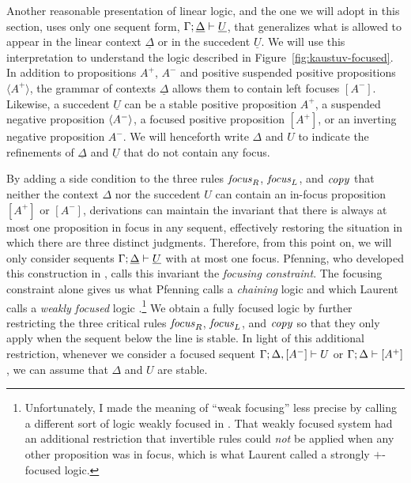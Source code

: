 Another reasonable presentation of linear logic, and the one we will
adopt in this section, uses only one sequent form,
${\Gamma};{\underline{\Delta}} \vdash {\underline{U}} \mathstrut$, that
generalizes what is allowed to appear in the linear context
$\underline{\Delta}$ or in the succedent $\underline{U}$. We will use
this interpretation to understand the logic described in
Figure~\ref{fig:kaustuv-focused}. In addition to propositions $A^+$,
$A^-$ and positive suspended positive propositions $\langle A^+ \rangle$, 
the grammar
of contexts $\underline{\Delta}$ allows them to contain left focuses
$[ A^- ]$.  Likewise, a succedent $\underline{U}$ can be a stable
positive proposition $A^+$, a suspended negative proposition
$\langle {A^-} \rangle$, a focused positive proposition $[ A^+ ]$, or an
inverting negative proposition $A^-$. We will henceforth write
$\Delta$ and $U$ to indicate the refinements of $\underline{\Delta}$
and $\underline{U}$ that do not contain any focus.



By adding a side condition to the three rules ${\it focus}_R$, ${\it
  focus}_L$, and ${\it copy}$ that neither the context $\Delta$ nor
the succedent $U$ can contain an in-focus proposition $[A^+]$ or
$[A^-]$, derivations can maintain the invariant that there is always
at most one proposition in focus in any sequent, effectively restoring
the situation in which there are three distinct
judgments. %
Therefore, from this point on, we will only consider sequents
${\Gamma};{\underline{\Delta}} \vdash {\underline{U}} \mathstrut$ with at most one
focus. Pfenning, who developed this construction in
\cite{pfenning12chaining}, calls this invariant the {\it focusing
  constraint}.
The focusing constraint alone gives us what Pfenning calls a {\it
  chaining} logic \cite{pfenning12chaining} and which Laurent calls a
{\it weakly focused} logic
\cite{laurent04proof}.\footnote{Unfortunately, I made the meaning of
  ``weak focusing'' less precise by calling a different sort of logic
  weakly focused in \cite{simmons11weak}.  That weakly focused system
  had an additional restriction that invertible rules could {\it not}
  be applied when any other proposition was in focus, which is what
  Laurent called a strongly $+$-focused logic.}  We obtain a fully
focused logic by further restricting the three critical rules ${\it
  focus}_R$, ${\it focus}_L$, and ${\it copy}$ so that they only apply
when the sequent below the line is stable. In light of this
additional restriction, whenever we consider a focused sequent
${\Gamma};{\Delta, [A^-]} \vdash {U} \mathstrut$ or
${\Gamma};{\Delta} \vdash {[A^+]} \mathstrut$, we can assume that $\Delta$ and $U$
are stable.

